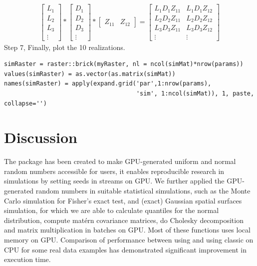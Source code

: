 \documentclass[article,nojss]{jss}\usepackage[]{graphicx}\usepackage[]{color}
\makeatletter
\newenvironment{kframe}{%
 \def\at@end@of@kframe{}%
 \ifinner\ifhmode%
  \def\at@end@of@kframe{\end{minipage}}%
  \begin{minipage}{\columnwidth}%
 \fi\fi%
 \def\FrameCommand##1{\hskip\@totalleftmargin \hskip-\fboxsep
 \colorbox{shadecolor}{##1}\hskip-\fboxsep
     \hskip-\linewidth \hskip-\@totalleftmargin \hskip\columnwidth}%
 \MakeFramed {\advance\hsize-\width
   \@totalleftmargin\z@ \linewidth\hsize
   \@setminipage}}%
 {\par\unskip\endMakeFramed%
 \at@end@of@kframe}
\newenvironment{knitrout}{}{} %
\makeatother
\begin{document}
\begin{gather}
 \begin{bmatrix}  L_{1} \\ L_{2} \\L_{3} \\ \vdots
 \end{bmatrix} 
 *
  \begin{bmatrix}
   D_{1} \\ D_{2} \\D_{3} \\ \vdots
   \end{bmatrix} 
   *
   \begin{bmatrix}
   Z_{11} & Z_{12}
   \end{bmatrix}
  =
 \begin{bmatrix}
   L_1D_1Z_{11} & L_1D_1Z_{12} \\
   L_2D_2Z_{11} & L_2D_2Z_{12} \\
   L_3D_3Z_{11} & L_3D_3Z_{12} \\
   \vdots  &   \vdots
  \end{bmatrix}
\end{gather}
Step 7, Finally, plot the 10 realizations.
\begin{knitrout}
\color{fgcolor}\begin{kframe}
\begin{verbatim}
simRaster = raster::brick(myRaster, nl = ncol(simMat)*nrow(params))
values(simRaster) = as.vector(as.matrix(simMat))
names(simRaster) = apply(expand.grid('par',1:nrow(params), 
                                     'sim', 1:ncol(simMat)), 1, paste, collapse='')
\end{verbatim}
\end{kframe}
\end{knitrout}








\section{Discussion}
The package  has been created to make GPU-generated uniform and normal random numbers accessible for  users, it enables reproducible research in simulations by setting seeds in streams on GPU. We further applied the GPU-generated random numbers in suitable statistical simulations, such as the Monte Carlo simulation for Fisher’s exact test, and (exact) Gaussian spatial surfaces simulation, for which we are able to calculate quantiles for the normal distribution, compute mat\'ern covariance matrices, do Cholesky decomposition and matrix multiplication in batches on GPU. Most of these functions uses local memory on GPU. Comparison of performance between using  and using classic  on CPU for some real data examples has demonstrated significant improvement in execution time. 
\end{document}
